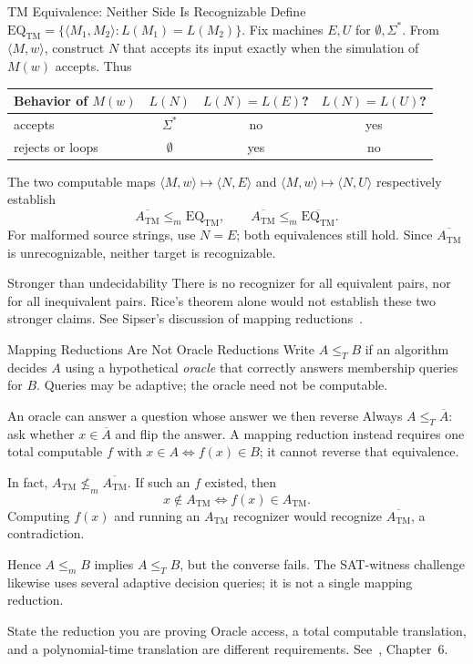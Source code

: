 \documentclass[10pt]{beamer}
\newcommand{\ATM}{A_{\mathrm{TM}}}
\begin{document}
\begin{frame}{TM Equivalence: Neither Side Is Recognizable}
  \small
  Define $\mathrm{EQ}_{\mathrm{TM}}=\{\langle M_1,M_2\rangle:
  L(M_1)=L(M_2)\}$. Fix machines $E,U$ for $\emptyset,\Sigma^*$.
  From $\langle M,w\rangle$, construct $N$ that accepts its input exactly
  when the simulation of $M(w)$ accepts. Thus
  \begin{center}
  \begin{tabular}{lccc}
    \toprule
    Behavior of $M(w)$ & $L(N)$ & $L(N)=L(E)$? & $L(N)=L(U)$? \\
    \midrule
    accepts & $\Sigma^*$ & no & yes \\
    rejects or loops & $\emptyset$ & yes & no \\
    \bottomrule
  \end{tabular}
  \end{center}
  The two computable maps $\langle M,w\rangle\mapsto\langle N,E\rangle$
  and $\langle M,w\rangle\mapsto\langle N,U\rangle$ respectively establish
  \[
    \overline{\ATM}\le_m\mathrm{EQ}_{\mathrm{TM}},
    \qquad
    \overline{\ATM}\le_m\overline{\mathrm{EQ}_{\mathrm{TM}}}.
  \]
  For malformed source strings, use $N=E$; both equivalences still hold.
  Since $\overline{\ATM}$ is unrecognizable, neither target is recognizable.
  \begin{block}{Stronger than undecidability}
    There is no recognizer for all equivalent pairs, nor for all inequivalent
    pairs. Rice's theorem alone would not establish these two stronger claims.
    See Sipser's discussion of mapping reductions~\cite{sipser,sipser-notes}.
  \end{block}
\end{frame}

\begin{frame}{Mapping Reductions Are Not Oracle Reductions}
  \small
  Write $A\le_T B$ if an algorithm decides $A$ using a hypothetical
  \emph{oracle} that correctly answers membership queries for $B$.
  Queries may be adaptive; the oracle need not be computable.
  \begin{block}{An oracle can answer a question whose answer we then reverse}
    Always $A\le_T\overline A$: ask whether $x\in\overline A$ and flip
    the answer. A mapping reduction instead requires one total computable
    $f$ with $x\in A\iff f(x)\in B$; it cannot reverse that equivalence.
  \end{block}
  In fact, $\ATM\not\le_m\overline{\ATM}$. If such an $f$ existed, then
  \[
    x\notin\ATM\iff f(x)\in\ATM.
  \]
  Computing $f(x)$ and running an $\ATM$ recognizer would recognize
  $\overline{\ATM}$, a contradiction.
  \par\smallskip
  Hence $A\le_m B$ implies $A\le_T B$, but the converse fails.
  The SAT-witness challenge likewise uses several adaptive decision
  queries; it is not a single mapping reduction.
  \begin{alertblock}{State the reduction you are proving}
    Oracle access, a total computable translation, and a polynomial-time
    translation are different requirements. See~\cite{sipser}, Chapter~6.
  \end{alertblock}
\end{frame}
\end{document}
